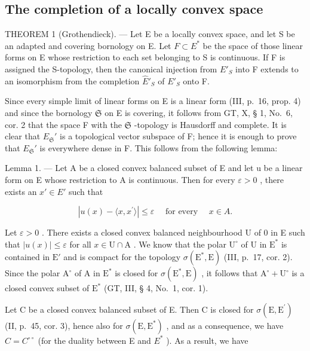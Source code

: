 \subsection{The completion of a locally convex space}

THEOREM 1 (Grothendieck). --- Let E be a locally convex space, and let S be an adapted and covering bornology on E. Let \(F \subset E^{*}\) be the space of those linear forms on E whose restriction to each set belonging to S is continuous. If F is assigned the S-topology, then the canonical injection from \(E'_{S}\) into F extends to an isomorphism from the completion \(\hat{E}'_{S}\) of \(E'_{S}\) onto F.

Since every simple limit of linear forms on E is a linear form (III, p.~16, prop. 4) and since the bornology \(\mathfrak{S}\) on E is covering, it follows from GT, X, § 1, No.~6, cor. 2 that the space F with the \(\mathfrak{S}\) -topology is Hausdorff and complete. It is clear that \(E_{\mathfrak{S}}'\) is a topological vector subspace of F; hence it is enough to prove that \(E_{\mathfrak{S}}'\) is everywhere dense in F. This follows from the following lemma:

Lemma 1. --- Let A be a closed convex balanced subset of E and let u be a linear form on E whose restriction to A is continuous. Then for every \(\varepsilon > 0\) , there exists an \(x' \in E'\) such that

\[
\left| u (x) - \langle x, x ^ {\prime} \rangle \right| \leqslant \varepsilon \quad \text { for   every } \quad x \in A.
\]

Let \(\varepsilon > 0\) . There exists a closed convex balanced neighbourhood U of 0 in E such that \(|u(x)| \leqslant \varepsilon\) for all \(x \in \mathrm{U} \cap \mathrm{A}\) . We know that the polar \(\mathrm{U}^{\circ}\) of U in \(\mathrm{E}^{*}\) is contained in \(\mathrm{E}'\) and is compact for the topology \(\sigma(\mathrm{E}^{*}, \mathrm{E})\) (III, p.~17, cor. 2). Since the polar \(\mathrm{A}^{\circ}\) of A in \(\mathrm{E}^{*}\) is closed for \(\sigma(\mathrm{E}^{*}, \mathrm{E})\) , it follows that \(\mathrm{A}^{\circ} + \mathrm{U}^{\circ}\) is a closed convex subset of \(\mathrm{E}^{*}\) (GT, III, § 4, No.~1, cor. 1).

Let C be a closed convex balanced subset of E. Then C is closed for \(\sigma(\mathrm{E},\mathrm{E}^{\prime})\) (II, p.~45, cor. 3), hence also for \(\sigma(\mathrm{E},\mathrm{E}^{*})\) , and as a consequence, we have \(C = C^{\circ\circ}\) (for the duality between E and \(E^{*}\) ). As a result, we have

